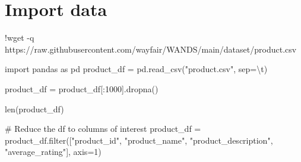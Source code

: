\documentclass[
  letterpaper,
  DIV=11,
  numbers=noendperiod]{scrreprt}
\newenvironment{Shaded}{\begin{snugshade}}{\end{snugshade}}
\newcommand{\BuiltInTok}[1]{\textcolor[rgb]{0.00,0.23,0.31}{#1}}
\newcommand{\CharTok}[1]{\textcolor[rgb]{0.13,0.47,0.30}{#1}}
\newcommand{\CommentTok}[1]{\textcolor[rgb]{0.37,0.37,0.37}{#1}}
\newcommand{\DecValTok}[1]{\textcolor[rgb]{0.68,0.00,0.00}{#1}}
\newcommand{\ImportTok}[1]{\textcolor[rgb]{0.00,0.46,0.62}{#1}}
\newcommand{\NormalTok}[1]{\textcolor[rgb]{0.00,0.23,0.31}{#1}}
\newcommand{\OperatorTok}[1]{\textcolor[rgb]{0.37,0.37,0.37}{#1}}
\newcommand{\StringTok}[1]{\textcolor[rgb]{0.13,0.47,0.30}{#1}}
\begin{document}
\hypertarget{import-data}{%
\chapter{Import data}\label{import-data}}

\begin{Shaded}
\begin{Highlighting}[]
\OperatorTok{!}\NormalTok{wget }\OperatorTok{{-}}\NormalTok{q https:}\OperatorTok{//}\NormalTok{raw.githubusercontent.com}\OperatorTok{/}\NormalTok{wayfair}\OperatorTok{/}\NormalTok{WANDS}\OperatorTok{/}\NormalTok{main}\OperatorTok{/}\NormalTok{dataset}\OperatorTok{/}\NormalTok{product.csv}
\end{Highlighting}
\end{Shaded}

\begin{Shaded}
\begin{Highlighting}[]
\ImportTok{import}\NormalTok{ pandas }\ImportTok{as}\NormalTok{ pd}
\NormalTok{product\_df }\OperatorTok{=}\NormalTok{ pd.read\_csv(}\StringTok{"product.csv"}\NormalTok{, sep}\OperatorTok{=}\StringTok{\textquotesingle{}}\CharTok{\textbackslash{}t}\StringTok{\textquotesingle{}}\NormalTok{)}
\end{Highlighting}
\end{Shaded}

\begin{Shaded}
\begin{Highlighting}[]
\NormalTok{product\_df }\OperatorTok{=}\NormalTok{ product\_df[:}\DecValTok{1000}\NormalTok{].dropna()}
\end{Highlighting}
\end{Shaded}

\begin{Shaded}
\begin{Highlighting}[]
\BuiltInTok{len}\NormalTok{(product\_df)}
\end{Highlighting}
\end{Shaded}

\begin{Shaded}
\begin{Highlighting}[]
\CommentTok{\# Reduce the df to columns of interest}
\NormalTok{product\_df }\OperatorTok{=}\NormalTok{ product\_df.}\BuiltInTok{filter}\NormalTok{([}\StringTok{"product\_id"}\NormalTok{, }\StringTok{"product\_name"}\NormalTok{, }\StringTok{"product\_description"}\NormalTok{, }\StringTok{"average\_rating"}\NormalTok{], axis}\OperatorTok{=}\DecValTok{1}\NormalTok{)}
\end{Highlighting}
\end{Shaded}
\end{document}
